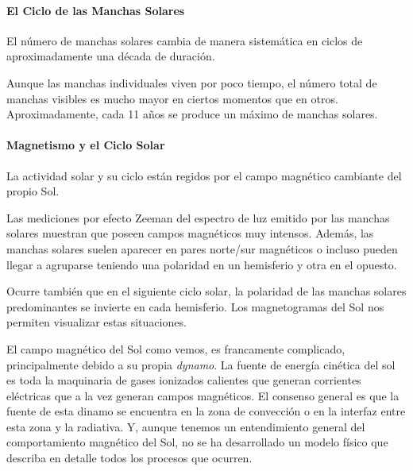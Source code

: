 \documentclass{tufte-handout}
\begin{document}
\paragraph{El Ciclo de las Manchas Solares}

El número de manchas solares cambia de manera sistemática en ciclos de aproximadamente una década de duración.

Aunque las manchas individuales viven por poco tiempo, el número total de manchas visibles es mucho mayor en ciertos momentos que en otros. Aproximadamente, cada 11 años se produce un máximo de manchas solares.

\paragraph{Magnetismo y el Ciclo Solar}

La actividad solar y su ciclo están regidos por el campo magnético cambiante del propio Sol.


Las mediciones por efecto Zeeman del espectro de luz emitido por las manchas solares muestran que poseen campos magnéticos muy intensos. Además, las manchas solares suelen aparecer en pares norte/sur magnéticos o incluso pueden llegar a agruparse teniendo una polaridad en un hemisferio y otra en el opuesto.

Ocurre también que en el siguiente ciclo solar, la polaridad de las manchas solares predominantes se invierte en cada hemisferio. Los magnetogramas del Sol nos permiten visualizar estas situaciones.

El campo magnético del Sol como vemos, es francamente complicado, principalmente debido a su propia \emph{dynamo}. La fuente de energía cinética del sol es toda la maquinaria de gases ionizados calientes que generan corrientes eléctricas que a la vez generan campos magnéticos. El consenso general es que la fuente de esta dinamo se encuentra en la zona de convección o en la interfaz entre esta zona y la radiativa. Y, aunque tenemos un entendimiento general del comportamiento magnético del Sol, no se ha desarrollado un modelo físico que describa en detalle todos los procesos que ocurren.
\end{document}
